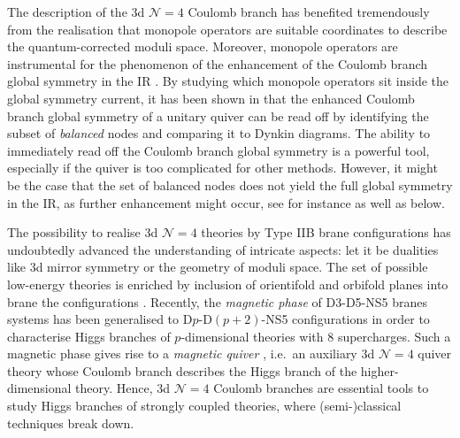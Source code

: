 \documentclass[a4paper,11pt]{article}
\newcommand{\Ncal}{\mathcal{N}}
\begin{document}
The description of the 3d $\Ncal=4$ Coulomb branch has benefited tremendously from the realisation that monopole operators \cite{Aharony:1997bx,Borokhov:2002ib,Borokhov:2002cg} are suitable coordinates to describe the quantum-corrected moduli space. Moreover, monopole operators are instrumental for the phenomenon of the enhancement of the Coulomb branch global symmetry in the IR \cite{Borokhov:2002cg,Gaiotto:2008ak,Bashkirov:2010hj}. By studying which monopole operators sit inside the global symmetry current, it has been shown in \cite{Gaiotto:2008ak} that the enhanced Coulomb branch global symmetry of a unitary quiver can be read off by identifying the subset of \emph{balanced} nodes and comparing it to Dynkin diagrams. The ability to immediately read off the Coulomb branch global symmetry is a powerful tool, especially if the quiver is too complicated for other methods. However, it might be the case that the set of balanced nodes does not yield the full global symmetry in the IR, as further enhancement might occur, see for instance \cite{Mekareeya:2017jgc,Bourget:2020mez,Gledhill:2021cbe} as well as below.

The possibility to realise 3d $\Ncal=4$ theories by Type IIB brane configurations \cite{Hanany:1996ie} has undoubtedly advanced the understanding of intricate aspects: let it be dualities like 3d mirror symmetry or the geometry of moduli space. The set of possible low-energy theories is enriched by inclusion of orientifold and orbifold planes into brane the configurations \cite{Uranga:1998uj,Gimon:1996rq,Hanany:1997gh,Kapustin:1998fa,Hanany:1999sj,Feng:2000eq,Gaiotto:2008ak}. Recently, the \emph{magnetic phase} of D3-D5-NS5 branes systems has been generalised to D$p$-D$(p{+}2)$-NS5 configurations in order to characterise Higgs branches of $p$-dimensional theories with 8 supercharges. Such a magnetic phase gives rise to a \emph{magnetic quiver} \cite{Cabrera:2018jxt,Cabrera:2019izd,Cabrera:2019dob, Bourget:2020gzi,Akhond:2020vhc,vanBeest:2020kou,Giacomelli:2020gee, VanBeest:2020kxw,Closset:2020scj,Closset:2020afy, Akhond:2021knl,vanBeest:2021xyt}, i.e.\ an auxiliary 3d $\Ncal=4$ quiver theory whose Coulomb branch describes the Higgs branch of the higher-dimensional theory. Hence, 3d $\Ncal=4$ Coulomb branches are essential tools to study Higgs branches of strongly coupled theories, where (semi-)classical techniques break down.
\end{document}
